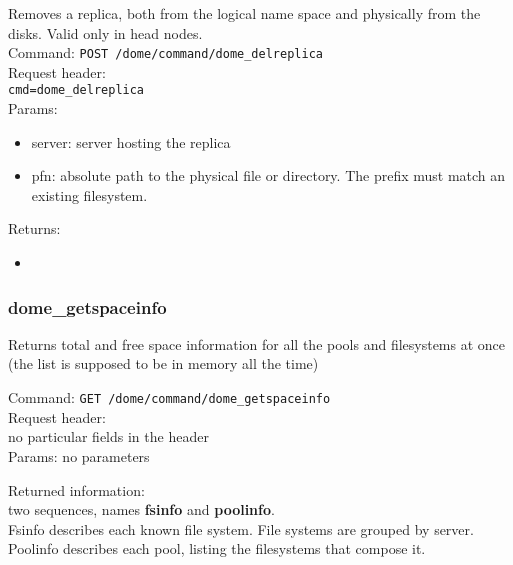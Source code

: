 \documentclass[a4paper,10pt]{scrreprt}
\begin{document}
Removes a replica, both from the logical name space and physically from the disks. Valid only in head nodes.\\
Command:
\lstinline"POST /dome/command/dome_delreplica"\\

Request header:\\
\lstinline"cmd=dome_delreplica"\\

Params:
\begin{itemize}
 \item server: server hosting the replica
 \item pfn: absolute path to the physical file or directory. The prefix must match an existing filesystem.
\end{itemize}

Returns:
\begin{itemize}
 \item
\end{itemize}



\subsubsection{dome\_getspaceinfo}
Returns total and free space information for all the pools and filesystems at once (the list is supposed to be in memory all the time)

Command:
\lstinline"GET /dome/command/dome_getspaceinfo"\\
Request header:\\
 no particular fields in the header\\
Params:
 no parameters

Returned information:\\
two sequences, names \textbf{fsinfo} and \textbf{poolinfo}.\\
Fsinfo describes each known file system. File systems are grouped by server.\\
Poolinfo describes each pool, listing the filesystems that compose it.\\
\end{document}
